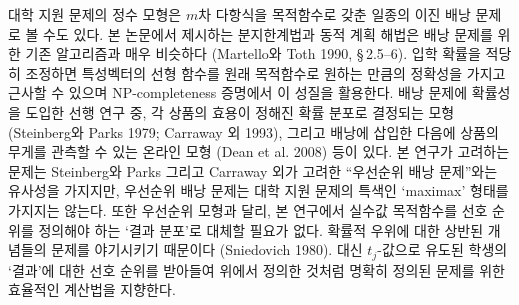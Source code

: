 \documentclass[11pt]{article} %
\newif\ifen
\theoremstyle{definition}
\theoremstyle{definition}
\begin{document}
\ifen
The integer formulation of the college application problem can also be viewed as a kind of binary knapsack problem with a polynomial objective function of degree $m$. Our branch-and-bound and dynamic programming algorithms closely resemble existing algorithms for knapsack problems (Martello and Toth 1990, \S\,2.5--6). In fact, by manipulating the admissions probabilities, the objective function can be made to approximate a linear function of the characteristic vector to an arbitrary degree of accuracy, a fact that we exploit in our NP-completeness proof. Previous research has introduced various forms of stochasticity to the knapsack problem, including variants in which each item's utility takes a known probability distribution (Steinberg and Parks 1979; Carraway et al. 1993) and an online context in which the weight of each item is observed after insertion into the knapsack (Dean et al. 2008). Our problem superficially resembles the preference-order knapsack problem considered by Steinberg and Parks and Carraway et al., but these models lack the college application problem's unique ``maximax'' form. Additionally, unlike those models, we do not attempt to replace the real-valued objective function with a preference order over \emph{outcome distributions,} which introduces technical issues concerning competing notions of stochastic dominance (Sniedovich 1980). We take for granted the student's preferences over \emph{outcomes} (as encoded in the $t_j$-values), and are interested instead in an efficient computational approach to the well-defined problem above.
\else
대학 지원 문제의 정수 모형은 $m$차 다항식을 목적함수로 갖춘 일종의 이진 배낭 문제로 볼 수도 있다. 본 논문에서 제시하는 분지한계법과 동적 계획 해법은 배낭 문제를 위한 기존 알고리즘과 매우 비슷하다 (Martello와 Toth 1990, \S\,2.5--6). 입학 확률을 적당히 조정하면 특성벡터의 선형 함수를 원래 목적함수로 원하는 만큼의 정확성을 가지고 근사할 수 있으며 NP-completeness 증명에서 이 성질을 활용한다. 배낭 문제에 확률성을 도입한 선행 연구 중, 각 상품의 효용이 정해진 확률 분포로 결정되는 모형(Steinberg와 Parks 1979; Carraway 외 1993), 그리고 배낭에 삽입한 다음에 상품의 무게를 관측할 수 있는 온라인 모형 (Dean et al. 2008) 등이 있다. 본 연구가 고려하는 문제는 Steinberg와 Parks 그리고 Carraway 외가 고려한 ``우선순위 배낭 문제''와는 유사성을 가지지만, 우선순위 배낭 문제는 대학 지원 문제의 특색인 `maximax' 형태를 가지지는 않는다. 또한 우선순위 모형과 달리, 본 연구에서 실수값 목적함수를 선호 순위를 정의해야 하는 `결과 분포'로 대체할 필요가 없다. 확률적 우위에 대한 상반된 개념들의 문제를 야기시키기 때문이다 (Sniedovich 1980). 대신 $t_j$-값으로 유도된 학생의 `결과'에 대한 선호 순위를 받아들여 위에서 정의한 것처럼 명확히 정의된 문제를 위한 효율적인 계산법을 지향한다.
\fi
\end{document}
